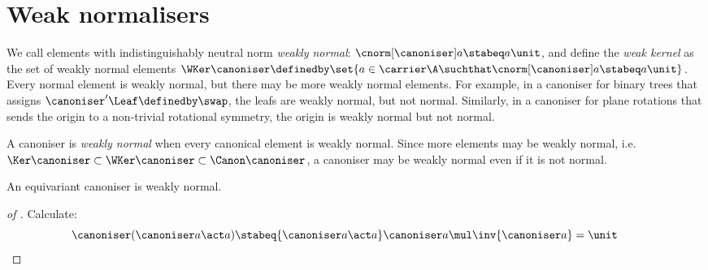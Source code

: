 \section{Weak normalisers}


We call elements with indistinguishably neutral norm \emph{weakly
normal}: $\cnorm[\canoniser]a \stabeq a \unit$, and define the
\emph{weak kernel} as the set of weakly normal elements $\WKer
\canoniser \definedby \set{a \in \carrier\A \suchthat
  \cnorm[\canoniser] a \stabeq a \unit}$.  Every normal element is
weakly normal, but there may be more weakly normal elements. For
example, in a canoniser for binary trees that assigns $\canoniser'
\Leaf \definedby \swap$, the leafs are weakly normal, but not
normal. Similarly, in a canoniser for plane rotations that sends the
origin to a non-trivial rotational symmetry, the origin is weakly
normal but not normal.

A canoniser is \emph{weakly normal} when every canonical element is
weakly normal. Since more elements may be weakly normal,
i.e.~$\Ker\canoniser \subset \WKer\canoniser \subset
\Canon\canoniser$, a canoniser may be weakly normal even if it is
not normal.

\begin{lemma}
  An equivariant canoniser is weakly normal.
\end{lemma}

\begin{proof}[of ]%
  Calculate:
  \[
  \canoniser(\canoniser a \act a) \stabeq{\canoniser a \act a}
  \canoniser a \mul \inv{\canoniser a} = \unit
  \tag*{\qedhere}
  \]
\end{proof}
